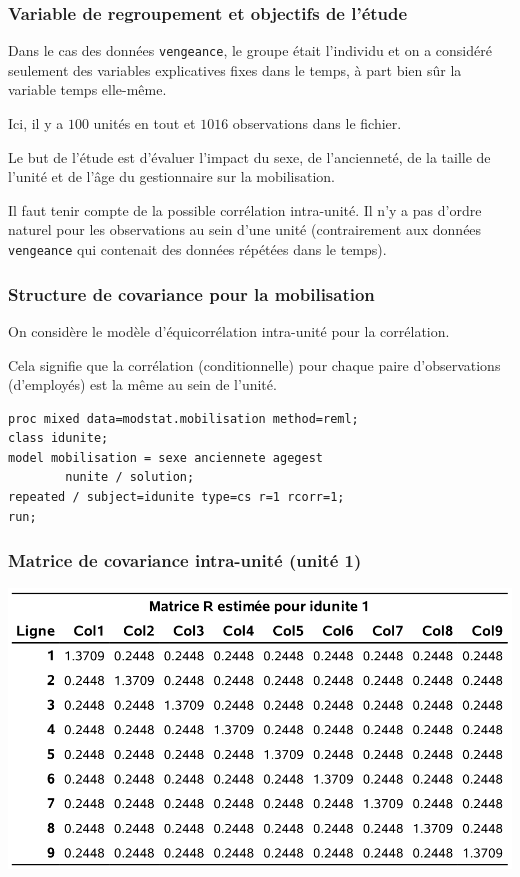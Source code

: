 \documentclass{beamer}
\begin{document}
\begin{frame}[fragile]
\frametitle{Variable de regroupement et objectifs de l'étude}
\bi
\item Dans le cas des données \texttt{vengeance}, le groupe était l'individu et on a considéré seulement des variables explicatives fixes dans le temps, à part bien sûr la variable temps elle-même.
\item Ici, il y a $100$ unités en tout et $1016$ observations dans le fichier.
\item Le but de l'étude est d'évaluer l'impact du sexe, de l'ancienneté, de la taille de l'unité et de l'âge du gestionnaire sur la mobilisation.
\item Il faut tenir compte de la possible corrélation intra-unité. Il n'y a pas d'ordre naturel pour les observations au sein d'une unité (contrairement aux données \texttt{vengeance} qui contenait des données répétées dans le temps).
\ei
\end{frame}
\begin{frame}[fragile]
\frametitle{Structure de covariance pour la mobilisation}
\bi
\item On considère le modèle d'équicorrélation intra-unité pour la corrélation.
\bi

\item Cela signifie que la corrélation (conditionnelle) pour chaque paire d'observations (d'employés) est la même au sein de l'unité.
\ei
   \ei
 \begin{tcolorbox}[colback=white, colframe=hecblue, title=Code \SASlang pour le modèle linéaire avec erreurs équicorrélées]
 \begin{small}
\begin{verbatim}
proc mixed data=modstat.mobilisation method=reml;
class idunite;
model mobilisation = sexe anciennete agegest
        nunite / solution;
repeated / subject=idunite type=cs r=1 rcorr=1;
run;
\end{verbatim}
\end{small}
\end{tcolorbox}

\end{frame}


 \begin{frame}
\frametitle{Matrice de covariance intra-unité (unité 1)}
\begin{center}
\includegraphics[width = 0.85\linewidth]{img/c6/diapos7-e07}

\end{center}
\end{frame}
\end{document}
